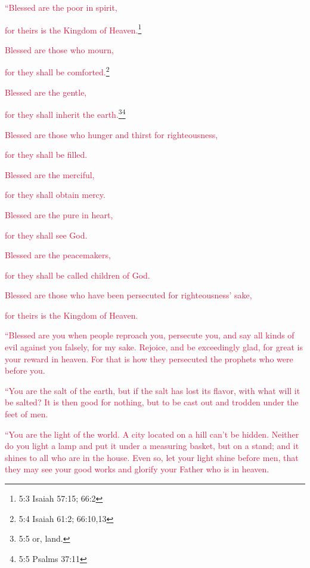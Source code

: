 \myverse{}\textcolor{crimson}{“Blessed are the poor in spirit,}

\textcolor{crimson}{for theirs is the Kingdom of Heaven.}\footnote{5:3 Isaiah 57:15;
	66:2}

\myverse{}\textcolor{crimson}{Blessed are those who mourn,}

\textcolor{crimson}{for they shall be comforted.}\footnote{5:4 Isaiah 61:2;
	66:10,13}

\myverse{}\textcolor{crimson}{Blessed are the gentle,}

\textcolor{crimson}{for they shall inherit the earth.}\footnote{5:5 or, land.}\footnote{5:5 Psalms 37:11}

\myverse{}\textcolor{crimson}{Blessed are those who hunger and thirst for righteousness,
}

\textcolor{crimson}{for they shall be filled.}

\myverse{}\textcolor{crimson}{Blessed are the merciful,}

\textcolor{crimson}{for they shall obtain mercy.}

\myverse{}\textcolor{crimson}{Blessed are the pure in heart,}

\textcolor{crimson}{for they shall see God.}

\myverse{}\textcolor{crimson}{Blessed are the peacemakers,}

\textcolor{crimson}{for they shall be called children of God.}

\myverse{}\textcolor{crimson}{Blessed are those who have been persecuted for righteousness’
	sake,
}

\textcolor{crimson}{for theirs is the Kingdom of Heaven.}

\myverse{}\textcolor{crimson}{“Blessed are you when people reproach you, persecute you,
	and say all kinds of evil against you falsely, for my sake.
}
\myverse{}\textcolor{crimson}{Rejoice, and be exceedingly glad, for great is your reward in heaven.
	For that is how they persecuted the prophets who were before you.
}

\myverse{}\textcolor{crimson}{“You are the salt of the earth, but if the salt has lost
	its flavor, with what will it be salted? It is then good for nothing, but to be cast out and trodden under
	the feet of men.
}

\myverse{}\textcolor{crimson}{“You are the light of the world. A city located on a hill
	can’t be hidden.
}
\myverse{}\textcolor{crimson}{Neither do you light a lamp and put it under a measuring basket, but on
	a stand; and it shines to all who are in the house.
}
\myverse{}\textcolor{crimson}{Even so, let your light shine before men, that they may see your good
	works and glorify your Father who is in heaven.}

